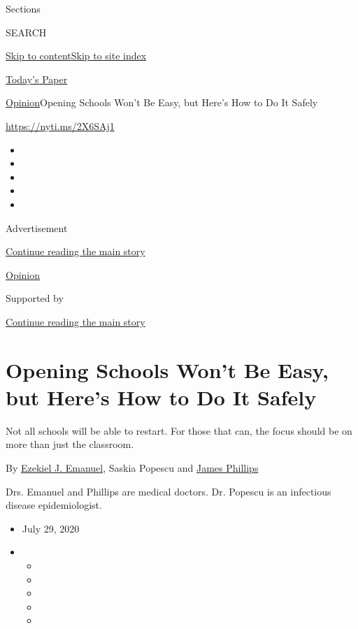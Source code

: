 Sections

SEARCH

\protect\hyperlink{site-content}{Skip to
content}\protect\hyperlink{site-index}{Skip to site index}

\href{https://myaccount.nytimes3xbfgragh.onion/auth/login?response_type=cookie\&client_id=vi}{}

\href{https://www.nytimes3xbfgragh.onion/section/todayspaper}{Today's
Paper}

\href{/section/opinion}{Opinion}\textbar{}Opening Schools Won't Be Easy,
but Here's How to Do It Safely

\url{https://nyti.ms/2X6SAj1}

\begin{itemize}
\item
\item
\item
\item
\item
\end{itemize}

Advertisement

\protect\hyperlink{after-top}{Continue reading the main story}

\href{/section/opinion}{Opinion}

Supported by

\protect\hyperlink{after-sponsor}{Continue reading the main story}

\hypertarget{opening-schools-wont-be-easy-but-heres-how-to-do-it-safely}{%
\section{Opening Schools Won't Be Easy, but Here's How to Do It
Safely}\label{opening-schools-wont-be-easy-but-heres-how-to-do-it-safely}}

Not all schools will be able to restart. For those that can, the focus
should be on more than just the classroom.

By \href{https://hcmg.wharton.upenn.edu/profile/zemanuel/}{Ezekiel J.
Emanuel}, Saskia Popescu and
\href{https://smhs.gwu.edu/emed/education-training/fellowships/ems-disaster}{James
Phillips}

Drs. Emanuel and Phillips are medical doctors. Dr. Popescu is an
infectious disease epidemiologist.

\begin{itemize}
\item
  July 29, 2020
\item
  \begin{itemize}
  \item
  \item
  \item
  \item
  \item
  \end{itemize}
\end{itemize}

